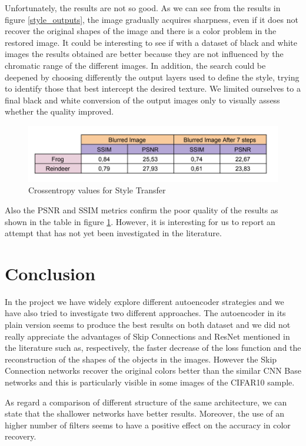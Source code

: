 \documentclass[12pt,a4paper]{article}
\begin{document}
Unfortunately, the results are not so good. As we can see from the results in figure \ref{style_outputs}, the image gradually acquires sharpness, even if it does not recover the original shapes of the image and there is a color problem in the restored image. It could be interesting to see if with a dataset of black and white images the results obtained are better because they are not influenced by the chromatic range of the different images. In addition, the search could be deepened by choosing differently the output layers used to define the style, trying to identify those that best intercept the desired texture. We limited ourselves to a final black and white conversion of the output images only to visually assess whether the quality improved. 

\begin{figure}[hptb]
\centering
\includegraphics[scale=0.5]{style_transfer.png} 
\caption{Crossentropy values for Style Transfer}
\label{style}
\end{figure}

Also the PSNR and SSIM metrics confirm the poor quality of the results as shown in the table in  figure \ref{style}. However, it is interesting for us to report an attempt that has not yet been investigated in the literature.

\section{Conclusion}
In the project we have widely explore different autoencoder strategies and we have also tried to investigate two different approaches. The autoencoder in its plain version seems to produce the best results on both dataset and we did not really appreciate the advantages of Skip Connections and ResNet mentioned in the literature such as, respectively, the faster decrease of the loss function and the reconstruction of the shapes of the objects in the images. However the Skip Connection networks recover the original colors better than the similar CNN Base networks and this is particularly visible in some images of the CIFAR10 sample.

As regard a comparison of different structure of the same architecture, we can state that the shallower networks have better results. Moreover, the use of an higher number of filters seems to have a positive effect on the accuracy in color recovery.
\end{document}
